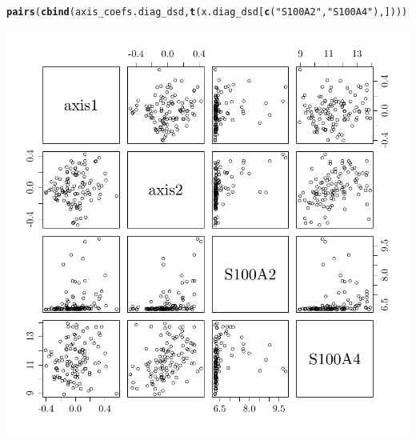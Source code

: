 \documentclass{article}\usepackage[]{graphicx}\usepackage[]{color}
\makeatletter
\def\maxwidth{ %
  \ifdim\Gin@nat@width>\linewidth
    \linewidth
  \else
    \Gin@nat@width
  \fi
}
\newcommand{\hlstr}[1]{\textcolor[rgb]{0.192,0.494,0.8}{#1}}%
\newcommand{\hlstd}[1]{\textcolor[rgb]{0.345,0.345,0.345}{#1}}%
\newcommand{\hlkwd}[1]{\textcolor[rgb]{0.737,0.353,0.396}{\textbf{#1}}}%
\newenvironment{kframe}{%
 \def\at@end@of@kframe{}%
 \ifinner\ifhmode%
  \def\at@end@of@kframe{\end{minipage}}%
  \begin{minipage}{\columnwidth}%
 \fi\fi%
 \def\FrameCommand##1{\hskip\@totalleftmargin \hskip-\fboxsep
 \colorbox{shadecolor}{##1}\hskip-\fboxsep
     \hskip-\linewidth \hskip-\@totalleftmargin \hskip\columnwidth}%
 \MakeFramed {\advance\hsize-\width
   \@totalleftmargin\z@ \linewidth\hsize
   \@setminipage}}%
 {\par\unskip\endMakeFramed%
 \at@end@of@kframe}
\newenvironment{knitrout}{}{} %
\makeatother
\begin{document}
\begin{knitrout}
\color{fgcolor}\begin{kframe}
\begin{alltt}
\hlkwd{pairs}\hlstd{(}\hlkwd{cbind}\hlstd{(axis_coefs.diag_dsd,} \hlkwd{t}\hlstd{(x.diag_dsd[}\hlkwd{c}\hlstd{(}\hlstr{"S100A2"}\hlstd{,} \hlstr{"S100A4"}\hlstd{),])))}
\end{alltt}
\end{kframe}

{\centering \includegraphics[width=\maxwidth]{figure/s100s-vs-a2-1} 

}



\end{knitrout}
\end{document}
